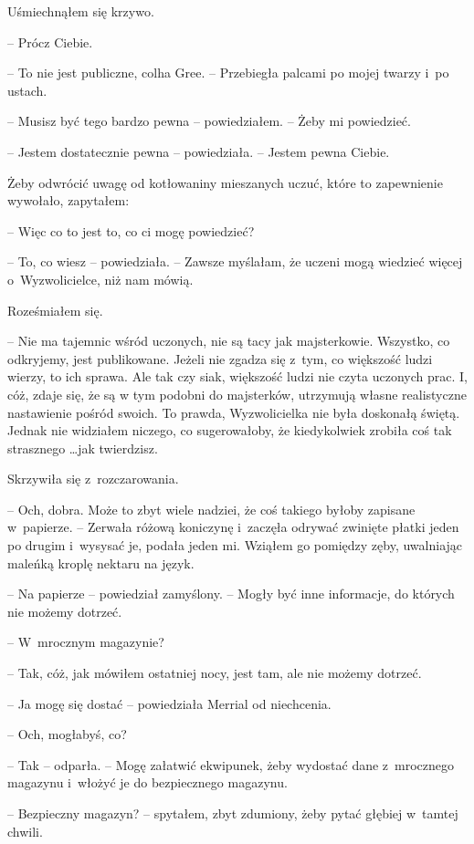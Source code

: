 \documentclass[oneside,polish,11pt,sfheadings]{mwbk}
\begin{document}
Uśmiechnąłem się krzywo. 

-- Prócz Ciebie.

-- To nie jest publiczne, colha Gree. -- Przebiegła palcami po mojej
twarzy i~po ustach.

-- Musisz być tego bardzo pewna -- powiedziałem. -- Żeby mi powiedzieć.

-- Jestem dostatecznie pewna -- powiedziała. -- Jestem pewna Ciebie.

Żeby odwrócić uwagę od kotłowaniny mieszanych uczuć, które to
zapewnienie wywołało, zapytałem: 

-- Więc co to jest to, co ci mogę
powiedzieć?

-- To, co wiesz -- powiedziała. -- Zawsze myślałam, że uczeni mogą wiedzieć
więcej o~Wyzwolicielce, niż nam mówią.

Roześmiałem się. 

-- Nie ma tajemnic wśród uczonych, nie są tacy jak
majsterkowie. Wszystko, co odkryjemy, jest publikowane. Jeżeli nie
zgadza się z~tym, co większość ludzi wierzy, to ich sprawa. Ale tak czy
siak, większość ludzi nie czyta uczonych prac. I, cóż, zdaje się, że są
w tym podobni do majsterków, utrzymują własne realistyczne nastawienie
pośród swoich. To prawda, Wyzwolicielka nie była doskonałą świętą.
Jednak nie widziałem niczego, co sugerowałoby, że kiedykolwiek zrobiła
coś tak strasznego \ldots jak twierdzisz.

Skrzywiła się z~rozczarowania. 

-- Och, dobra. Może to zbyt wiele nadziei,
że coś takiego byłoby zapisane w~papierze. -- Zerwała różową koniczynę i~zaczęła odrywać zwinięte płatki jeden po drugim i~wysysać je, podała
jeden mi. Wziąłem go pomiędzy zęby, uwalniając maleńką kroplę nektaru na
język.

-- Na papierze -- powiedział zamyślony. -- Mogły być inne informacje, do
których nie możemy dotrzeć.

-- W~mrocznym magazynie?

-- Tak, cóż, jak mówiłem ostatniej nocy, jest tam, ale nie możemy
dotrzeć.

-- Ja mogę się dostać -- powiedziała Merrial od niechcenia.

-- Och, mogłabyś, co?

-- Tak -- odparła. -- Mogę załatwić ekwipunek, żeby wydostać dane z~mrocznego magazynu i~włożyć je do bezpiecznego magazynu.

-- Bezpieczny magazyn? -- spytałem, zbyt zdumiony, żeby pytać głębiej w~tamtej chwili.
\end{document}

